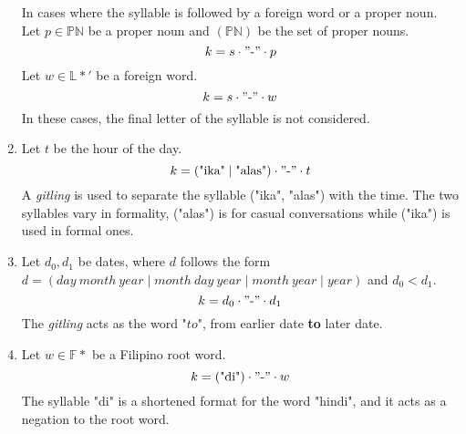 \begin{enumerate}
            In cases where the syllable is followed by a foreign word or a proper noun. Let \(p \in \mathbb{PN}\) be a proper noun and \((\mathbb{PN})\) be the set of proper nouns.
            \[
            k = s \cdot "\text{-}" \cdot p
            \]
            Let \(w \in \mathbb{L*'}\) be a foreign word.
            \[
            k = s \cdot "\text{-}" \cdot w
            \]
            In these cases, the final letter of the syllable is not considered.
      \item
            Let $t$ be the hour of the day.
            \[
            k = (\text{"ika"}\mid\text{"alas"}) \cdot "\text{-}" \cdot t
            \]
            A \textit{gitling} is used to separate the syllable ("ika", "alas") with the time. The two syllables vary in formality, ("alas") is for casual conversations while ("ika") is used in formal ones. 
      \item
            Let \(d_0, d_1\) be dates, where \(d\) follows the form \(d = (day \ month \ year \mid month \ day \ year \mid month \ year \mid year)\) and \(d_0 < d_1\).
            \[
            k = d_0 \cdot "\text{-}" \cdot d_1
            \]
            The \textit{gitling} acts as the word "$to$", from earlier date \textbf{to} later date.
    \item 
            Let \(w \in \mathbb{F}*\) be a Filipino root word.
            \[
            k = (\text{"di"}) \cdot "\text{-}" \cdot w
            \]
            The syllable "di" is a shortened format for the word "hindi", and it acts as a negation to the root word.
            
      
\end{enumerate}